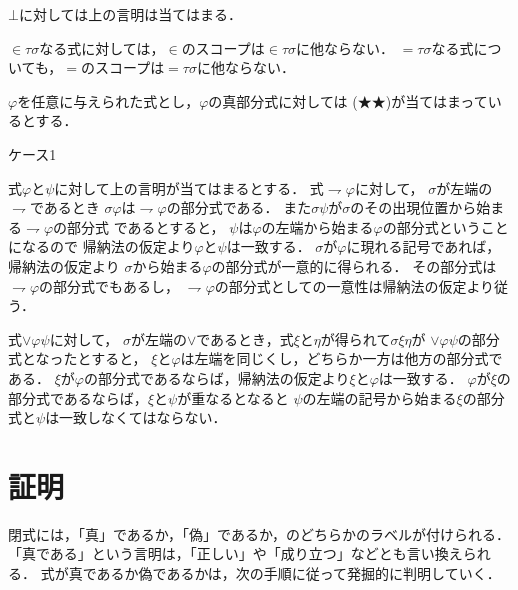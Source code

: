 \documentclass[a4j,10.5pt,oneside,openany]{jsbook}
\begin{document}
	$\bot$に対しては上の言明は当てはまる．
	
	$\in \tau \sigma$なる式に対しては，$\in$のスコープは$\in \tau \sigma$に他ならない．
	$= \tau \sigma$なる式についても，$=$のスコープは$= \tau \sigma$に他ならない．
	
	$\varphi$を任意に与えられた式とし，$\varphi$の真部分式に対しては
	(★★)が当てはまっているとする．
	
	\begin{description}
		\item[ケース1] 
	\end{description}
	式$\varphi$と$\psi$に対して上の言明が当てはまるとする．
	式$\rightharpoondown \varphi$に対して，
	$\sigma$が左端の$\rightharpoondown$であるとき
	$\sigma \varphi$は$\rightharpoondown \varphi$の部分式である．
	また$\sigma \psi$が$\sigma$のその出現位置から始まる$\rightharpoondown \varphi$の部分式
	であるとすると，
	$\psi$は$\varphi$の左端から始まる$\varphi$の部分式ということになるので
	帰納法の仮定より$\varphi$と$\psi$は一致する．
	$\sigma$が$\varphi$に現れる記号であれば，帰納法の仮定より
	$\sigma$から始まる$\varphi$の部分式が一意的に得られる．
	その部分式は$\rightharpoondown \varphi$の部分式でもあるし，
	$\rightharpoondown \varphi$の部分式としての一意性は帰納法の仮定より従う．
	
	式$\vee \varphi \psi$に対して，
	$\sigma$が左端の$\vee$であるとき，式$\xi$と$\eta$が得られて$\sigma \xi \eta$が
	$\vee \varphi \psi$の部分式となったとすると，
	$\xi$と$\varphi$は左端を同じくし，どちらか一方は他方の部分式である．
	$\xi$が$\varphi$の部分式であるならば，帰納法の仮定より$\xi$と$\varphi$は一致する．
	$\varphi$が$\xi$の部分式であるならば，$\xi$と$\psi$が重なるとなると
	$\psi$の左端の記号から始まる$\xi$の部分式と$\psi$は一致しなくてはならない．
	
\section{証明}
	閉式には，「真」であるか，「偽」であるか，のどちらかのラベルが付けられる．
	「真である」という言明は，「正しい」や「成り立つ」などとも言い換えられる．
	式が真であるか偽であるかは，次の手順に従って発掘的に判明していく．
	
\end{document}
